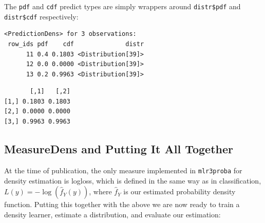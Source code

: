 The \texttt{pdf} and \texttt{cdf} predict types are simply wrappers
around \texttt{distr\$pdf} and \texttt{distr\$cdf} respectively:

\begin{Shaded}
\begin{Highlighting}[]
\OtherTok{=}\SpecialCharTok{$}\SpecialCharTok{:}\NormalTok{)}\SpecialCharTok{$}\SpecialCharTok{:}\NormalTok{)}
\end{Highlighting}
\end{Shaded}

\begin{verbatim}
<PredictionDens> for 3 observations:
 row_ids pdf    cdf              distr
      11 0.4 0.1803 <Distribution[39]>
      12 0.0 0.0000 <Distribution[39]>
      13 0.2 0.9963 <Distribution[39]>
\end{verbatim}

\begin{Shaded}
\begin{Highlighting}[]
\SpecialCharTok{$}\SpecialCharTok{$}\SpecialCharTok{$}\NormalTok{()}\SpecialCharTok{$}\NormalTok{x[}\SpecialCharTok{:}\NormalTok{]),}
\SpecialCharTok{$}\NormalTok{cdf[}\SpecialCharTok{:}\NormalTok{])}
\end{Highlighting}
\end{Shaded}

\begin{verbatim}
       [,1]   [,2]
[1,] 0.1803 0.1803
[2,] 0.0000 0.0000
[3,] 0.9963 0.9963
\end{verbatim}

\hypertarget{measuredens-and-putting-it-all-together}{%
\subsection{MeasureDens and Putting It All
Together}\label{measuredens-and-putting-it-all-together}}

At the time of publication, the only measure implemented in
\texttt{mlr3proba} for density estimation is logloss, which is defined
in the same way as in classification, \(L(y) = -\log(\hat{f}_Y(y))\),
where \(\hat{f}_Y\) is our estimated probability density function.
Putting this together with the above we are now ready to train a density
learner, estimate a distribution, and evaluate our estimation:

